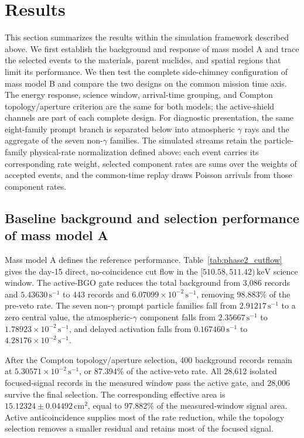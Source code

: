 \documentclass[11pt]{article}
\newcommand{\keV}{\ensuremath{\,\mathrm{keV}}}
\newcommand{\cps}{\ensuremath{\,\mathrm{s^{-1}}}}
\begin{document}
\section{Results}
\label{sec:results}

This section summarizes the results within the simulation framework described above. We first establish the background and response of mass model A and trace the selected events to the materials, parent nuclides, and spatial regions that limit its performance. We then test the complete side-chimney configuration of mass model B and compare the two designs on the common mission time axis. The energy response, science window, arrival-time grouping, and Compton topology/aperture criterion are the same for both models; the active-shield channels are part of each complete design. For diagnostic presentation, the same eight-family prompt branch is separated below into atmospheric $\gamma$ rays and the aggregate of the seven non-$\gamma$ families. The simulated streams retain the particle-family physical-rate normalization defined above: each event carries its corresponding rate weight, selected component rates are sums over the weights of accepted events, and the common-time replay draws Poisson arrivals from those component rates.

\subsection{Baseline background and selection performance of mass model A}
\label{subsec:model_a_baseline}
\label{subsec:reference_background_results}

Mass model A defines the reference performance. Table~\ref{tab:phase2_cutflow} gives the day-15 direct, no-coincidence cut flow in the $[510.58,511.42)\keV$ science window. The active-BGO gate reduces the total background from 3,086 records and $5.43630\cps$ to 443 records and $6.07099\times10^{-2}\cps$, removing 98.883\% of the pre-veto rate. The seven non-$\gamma$ prompt particle families fall from $2.91217\cps$ to a zero central value, the atmospheric-$\gamma$ component falls from $2.35667\cps$ to $1.78923\times10^{-2}\cps$, and delayed activation falls from $0.167460\cps$ to $4.28176\times10^{-2}\cps$.

After the Compton topology/aperture selection, 400 background records remain at $5.30571\times10^{-2}\cps$, or 87.394\% of the active-veto rate. All 28,612 isolated focused-signal records in the measured window pass the active gate, and 28,006 survive the final selection. The corresponding effective area is $15.12324\pm0.04492\,\mathrm{cm^2}$, equal to 97.882\% of the measured-window signal area. Active anticoincidence supplies most of the rate reduction, while the topology selection removes a smaller residual and retains most of the focused signal.
\end{document}
